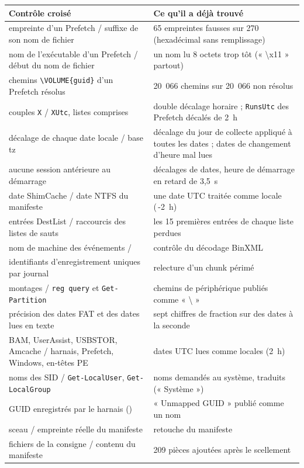 \documentclass[11pt,a4paper,oneside]{report}
\begin{document}
\begin{longtable}{@{}L{6.6cm}L{8.4cm}@{}}
\toprule
\textbf{Contrôle croisé} & \textbf{Ce qu'il a déjà trouvé} \\
\midrule
\endhead
empreinte d'un Prefetch / suffixe de son nom de fichier & 65 empreintes fausses sur 270 (hexadécimal sans remplissage) \\
nom de l'exécutable d'un Prefetch / début du nom de fichier & un nom lu 8 octets trop tôt (« \textbackslash x11 » partout) \\
chemins \texttt{\textbackslash VOLUME\{guid\}} d'un Prefetch résolus & 20~066 chemins sur 20~066 non résolus \\
couples \texttt{X} / \texttt{XUtc}, listes comprises & double décalage horaire ; \texttt{RunsUtc} des Prefetch décalés de 2~h \\
décalage de chaque date locale / base tz & décalage du jour de collecte appliqué à toutes les dates ; dates de changement d'heure mal lues \\
aucune session antérieure au démarrage & décalages de dates, heure de démarrage en retard de 3,5~s \\
date ShimCache / date NTFS du manifeste & une date UTC traitée comme locale (\,-2~h) \\
entrées DestList / raccourcis des listes de sauts & les 15 premières entrées de chaque liste perdues \\
nom de machine des événements /  & contrôle du décodage BinXML \\
identifiants d'enregistrement uniques par journal & relecture d'un chunk périmé \\
montages / \texttt{reg query} et \texttt{Get-Partition} & chemins de périphérique publiés comme « \textbackslash{} » \\
précision des dates FAT et des dates lues en texte & sept chiffres de fraction sur des dates à la seconde \\
BAM, UserAssist, USBSTOR, Amcache / harnais, Prefetch, Windows, en-têtes PE & dates UTC lues comme locales (2~h) \\
noms des SID / \texttt{Get-LocalUser}, \texttt{Get-LocalGroup} & noms demandés au système, traduits (« Système ») \\
GUID enregistrés par le harnais () & « Unmapped GUID » publié comme un nom \\
sceau / empreinte réelle du manifeste & retouche du manifeste \\
fichiers de la consigne / contenu du manifeste & 209 pièces ajoutées après le scellement \\

\end{longtable}
\end{document}
